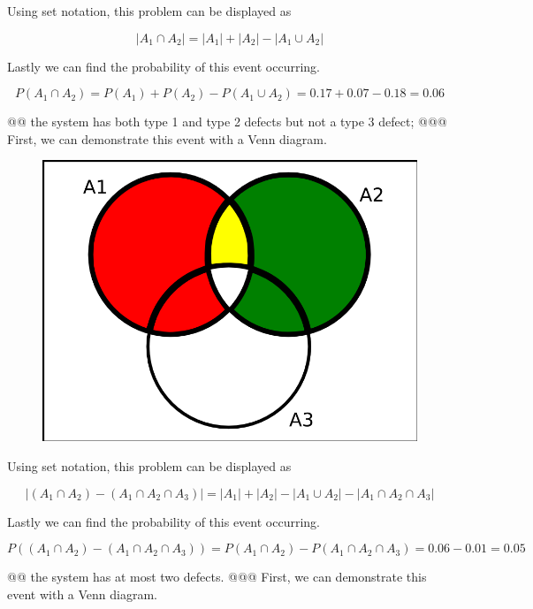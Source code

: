 \documentclass[10pt]{article}
\begin{document}
\begin{easylist}[enumerate]
        Using set notation, this problem can be displayed as

        \[ |A_1 \cap A_2| = |A_1| + |A_2| - |A_1 \cup A_2| \]

        Lastly we can find the probability of this event occurring.

        \[ P(A_1 \cap A_2) = P(A_1) + P(A_2) - P(A_1 \cup A_2) = 0.17 + 0.07 - 0.18 = \boxed{0.06} \]

    @@ the system has both type 1 and type 2 defects but not a type 3 defect;
    @@@ First, we can demonstrate this event with a Venn diagram.

        \begin{figure}[!ht]
            \centering
            \includegraphics[scale=0.3]{./img/ps3_3.png}
        \end{figure}

        Using set notation, this problem can be displayed as

        \[ |(A_1 \cap A_2) - (A_1 \cap A_2 \cap A_3)| = |A_1| + |A_2| - |A_1 \cup A_2| - |A_1 \cap A_2 \cap A_3| \]

        Lastly we can find the probability of this event occurring.

        \[ P((A_1 \cap A_2) - (A_1 \cap A_2 \cap A_3)) = P(A_1 \cap A_2) - P(A_1 \cap A_2 \cap A_3) = 0.06 - 0.01 = \boxed{0.05} \]

    @@ the system has at most two defects.
    @@@ First, we can demonstrate this event with a Venn diagram.


\end{easylist}
\end{document}
